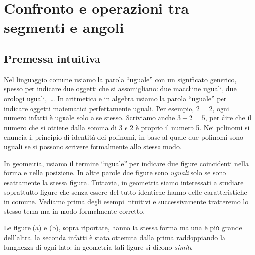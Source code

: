 \vspazio\ovalbox{\risolvii \ref{ese:1.51}, \ref{ese:1.52}, 
\ref{ese:1.53}, \ref{ese:1.54}, \ref{ese:1.55}, \ref{ese:1.56}, 
\ref{ese:1.57}, \ref{ese:1.58}, \ref{ese:1.59}, \ref{ese:1.60}, 
\ref{ese:1.61}, \ref{ese:1.62}, \ref{ese:1.63},
}

\ovalbox{\ref{ese:1.64}, \ref{ese:1.65}}


\section{Confronto e operazioni tra segmenti e 
angoli}\label{sect:operazioni_segmenti_angoli}

\subsection{Premessa intuitiva}

Nel linguaggio comune usiamo la parola ``uguale'' con un significato 
generico, spesso per indicare due oggetti che si assomigliano: due 
macchine uguali, due orologi uguali,~\ldots{} In aritmetica e in 
algebra usiamo la parola ``uguale'' per indicare oggetti matematici 
perfettamente uguali. Per esempio, \(2=2\), ogni numero infatti è 
uguale solo a se stesso. Scriviamo anche \(3+2=5\), per dire che il 
numero che si ottiene dalla somma di 3 e 2 è proprio il numero 5. Nei 
polinomi si enuncia il principio di identità dei polinomi, in base al 
quale due polinomi sono uguali se si possono scrivere formalmente 
allo stesso modo.

In geometria, usiamo il termine ``uguale'' per indicare due figure 
coincidenti nella forma e nella posizione. In altre parole due figure 
sono \emph{uguali} solo se sono esattamente la stessa figura. 
Tuttavia, in geometria siamo interessati a studiare soprattutto 
figure che senza essere del tutto identiche hanno delle 
caratteristiche in comune. Vediamo prima degli esempi intuitivi e 
successivamente tratteremo lo stesso tema ma in modo formalmente 
corretto.


\begin{inaccessibleblock}
 \begin{figure}[htb]
\centering\qquad\qquad

\end{figure}
\end{inaccessibleblock}

Le figure (a) e (b), sopra riportate, hanno la stessa forma ma una è 
più grande dell'altra, la seconda infatti è stata ottenuta dalla 
prima raddoppiando la lunghezza di ogni lato: in geometria tali 
figure si dicono \emph{simili}.


